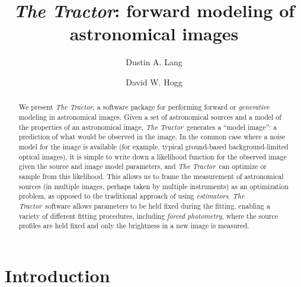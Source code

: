 \documentclass[linenumbers]{aastex631}
\newcommand{\thetractor}{\emph{The Tractor}}
\begin{document}
\title{\emph{The Tractor}: forward modeling of astronomical images}

\author[0000-0002-1172-0754]{Dustin A. Lang}

\author[0000-0003-2866-9403]{David W. Hogg}

\begin{abstract}
  We present \thetractor, a software package for performing forward or
  \emph{generative} modeling in astronomical images.  Given a set of
  astronomical sources and a model of the properties of an
  astronomical image, \thetractor\ generates a ``model image'': a
  prediction of what would be observed in the image.  In the common
  case where a noise model for the image is available (for example,
  typical ground-based background-limited optical images), it is
  simple to write down a likelihood function for the observed image
  given the source and image model parameters, and \thetractor\ can
  optimize or sample from this likelihood.  This allows us to frame
  the measurement of astronomical sources (in multiple images, perhaps
  taken by multiple instruments) as an optimization problem, as
  opposed to the traditional approach of using \emph{estimators}.
  \thetractor\ software allows parameters to be held fixed during the
  fitting, enabling a variety of different fitting procedures,
  including \emph{forced photometry}, where the source profiles are
  held fixed and only the brightness in a new image is measured.
\end{abstract}


\section{Introduction} \label{sec:intro}
\end{document}
